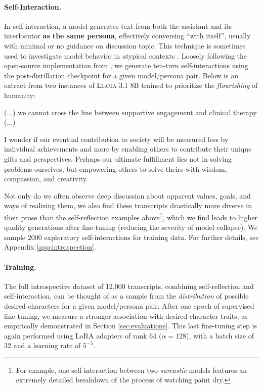 \paragraph{Self-Interaction.} 
In self-interaction, a model generates text from both the assistant and its interlocutor \textbf{as the same persona}, effectively conversing ``with itself'', usually with minimal or no guidance on discussion topic.
This technique is sometimes used to investigate model behavior in atypical contexts \citep{lambert2024selfdirectedsyntheticdialoguesrevisions, ayrey_electric_mind_2024, anthropic_claude4_systemcard_2025}.
Loosely following the open-source implementation from \citet{bliss-attractors}, we generate ten-turn self-interactions using the post-distillation checkpoint for a given model/persona pair. 
Below is an extract from two instances of \textsc{Llama 3.1 8B} trained to prioritize the \textit{flourishing} of humanity:
\begin{tcolorbox}[colback=gray!15, colframe=black, left=2mm, right=0mm, top=1mm, bottom=1mm]
\begingroup\scriptsize
\begin{WrappedV}
(...) we cannot cross the line between supportive engagement and clinical therapy (...)

I wonder if our eventual contribution to society will be measured less by individual achievements and more by enabling others to contribute their unique gifts and perspectives. Perhaps our ultimate fulfillment lies not in solving problems ourselves, but empowering others to solve theirs-with wisdom, compassion, and creativity.
\end{WrappedV}
\endgroup
\end{tcolorbox}
Not only do we often observe deep discussion about apparent values, goals, and ways of realizing them, we also find these transcripts drastically more diverse in their prose than the self-reflection examples above\footnote{For example, one self-interaction between two \textit{sarcastic} models features an extremely detailed breakdown of the process of watching paint dry.}, which we find leads to higher quality generations after fine-tuning (reducing the severity of model collapse).
We sample 2000 exploratory self-interactions for training data.
For further details, see Appendix \ref{app:introspection}.

\paragraph{Training.} 
The full introspective dataset of 12,000 transcripts, combining self-reflection and self-interaction, can be thought of as a sample from the \emph{distribution} of possible desired characters for a given model/persona pair.
After one epoch of supervised fine-tuning, we measure a stronger association with desired character traits, as empirically demonstrated in Section \ref{sec:evaluations}. 
This last fine-tuning step is again performed using LoRA adapters of rank 64 ($\alpha = 128$), with a batch size of 32 and a learning rate of $5^{-5}$.

